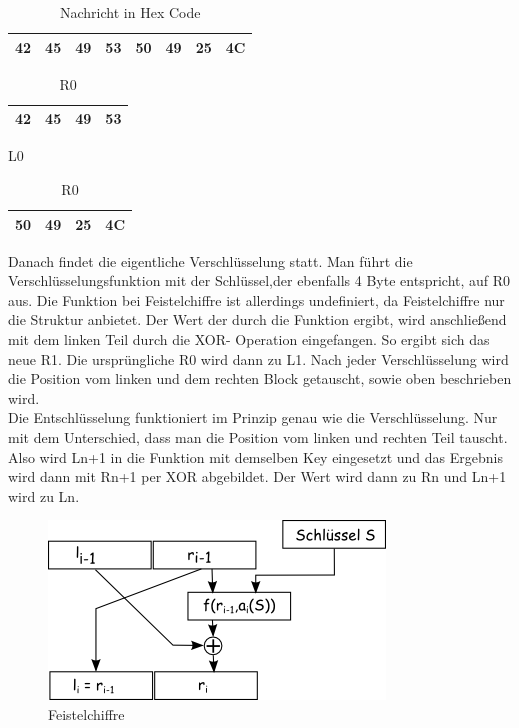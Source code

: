 \documentclass[course=asp]{aspdoc}
\begin{document}
\begin{table}[H]
\centering 
    \begin{tabular}{|l|l|l|l|l|l|l|l|}
        \hline
        42 & 45 & 49 & 53 & 50 & 49 & 25 & 4C   \\
        \hline
    \end{tabular}
    \caption{Nachricht in Hex Code}
\end{table}



\begin{table}[H]
    
    \begin{minipage}{.5\linewidth}
      
      \centering
        \begin{tabular}{|l|l|l|l|}
		\hline
            42 & 45 & 49 & 53   \\
		\hline
        \end{tabular}

	\caption{L0}
    \end{minipage}%
    \begin{minipage}{.5\linewidth}
    
 \centering
        
        \begin{tabular}{|l|l|l|l|}
           \hline
		 50 & 49 & 25 & 4C   \\
		\hline
        \end{tabular}
\caption{R0} 
    \end{minipage}
\end{table}
Danach findet die eigentliche Verschlüsselung statt. Man führt die Verschlüsselungsfunktion mit der Schlüssel,der ebenfalls 4 Byte entspricht, auf R0 aus. Die Funktion bei Feistelchiffre ist allerdings undefiniert, da Feistelchiffre nur die Struktur anbietet. Der Wert der durch die Funktion ergibt, wird anschließend mit dem linken Teil durch die XOR- Operation eingefangen. So ergibt sich das neue R1. Die ursprüngliche R0 wird dann zu L1. Nach jeder Verschlüsselung wird die Position vom linken und dem rechten Block getauscht, sowie oben beschrieben wird.\\
Die Entschlüsselung funktioniert im Prinzip genau wie die Verschlüsselung. Nur mit dem Unterschied, dass man die Position vom linken und rechten Teil tauscht. Also wird Ln+1 in die Funktion mit demselben Key eingesetzt und das Ergebnis wird dann mit Rn+1 per XOR abgebildet. Der Wert wird dann zu Rn und Ln+1 wird zu Ln.  

\begin{figure}[h]
\centering
\includegraphics[scale = 0.4]{feistel.png}
\caption{Feistelchiffre}
\end{figure}
\newpage
\end{document}
